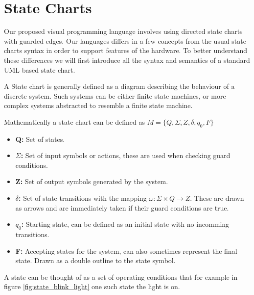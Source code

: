 \section{State Charts}

Our proposed visual programming language involves using directed state charts with guarded edges. Our languages differs in a few concepts from the usual state charts syntax in order to support features of the hardware. To better understand these differences we will first introduce all the syntax and semantics of a standard UML based state chart.

A State chart is generally defined as a diagram describing the behaviour of a discrete system. Such systems can be either finite state machines, or more complex systems abstracted to resemble a finite state machine. 

Mathematically a state chart can be defined as $M = \lbrace Q, \Sigma, Z, \delta, q_0, F \rbrace$

\begin{itemize}
	\item \textbf{Q:} Set of states.
	\item \textbf{$\Sigma$:} Set of input symbols or actions, these are used when checking guard conditions.
	\item \textbf{Z:} Set of output symbols generated by the system.
	\item \textbf{$\delta$:} Set of state transitions with the mapping $\omega: \Sigma \times Q \rightarrow Z$. These are drawn as arrows and are immediately taken if their guard conditions are true.
	\item \textbf{$q_0$:} Starting state, can be defined as an initial state with no incomming transitions.
	\item \textbf{F:} Accepting states for the system, can also sometimes represent the final state. Drawn as a double outline to the state symbol.
\end{itemize}

A state can be thought of as a set of operating conditions that for example in figure \ref{fig:state_blink_light}
one such state the light is on.

